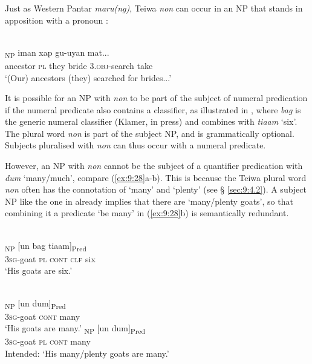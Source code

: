 Just as Western Pantar \textit{maru(ng)}, Teiwa \textit{non} can occur in an NP that stands in apposition with a pronoun :


\ea%
\label{ex:9:26}
 \\
\textsubscript{NP} iman xap gu-uyan mat... \\
  ancestor \textsc{pl} they bride  3.\textsc{obj-}search take  \\
\glt `(Our) ancestors (they) searched for brides...'
\z






It is possible for an NP with \textit{non} to be part of the subject of numeral predication if the numeral predicate also contains a classifier, as illustrated in , where \textit{bag} is the generic numeral classifier (Klamer, in press) and combines with \textit{tiaam} `six'. The plural word \textit{non} is part of the subject NP, and is grammatically optional. Subjects pluralised with \textit{non} can thus occur with a numeral predicate.

However, an NP with \textit{non} cannot be the subject of a quantifier predication with \textit{dum} `many/much', compare (\ref{ex:9:28}a-b). This is because the Teiwa plural word \textit{non} often has the connotation of `many' and `plenty' (see {\S} \ref{sec:9:4.2}). A subject NP like the one in  already implies that there are `many/plenty goats', so that combining it a predicate `be many' in (\ref{ex:9:28}b) is semantically redundant.


\ea%
\label{ex:9:27}
 \\
\textsubscript{NP} [{un} bag {tiaam}]\textsubscript{Pred} \\
    \textsc{3sg}-goat \textsc{pl} \textsc{cont} \textsc{clf} six \\
\glt `His goats are six.'
\z







\ea%
\label{ex:9:28}
 \\
\ea
\gll [{Ga-qavif}]\textsubscript{NP} [un dum]\textsubscript{Pred}  \\
 \textsc{3sg}-goat \textsc{cont} many   \\
\glt `His goats are many.'
\ex
{}\textsubscript{NP} [un dum]\textsubscript{Pred}  \\
    \textsc{3sg}-goat \textsc{pl} \textsc{cont} many\\
\glt Intended: `His many/plenty goats are many.'
\z
\z






